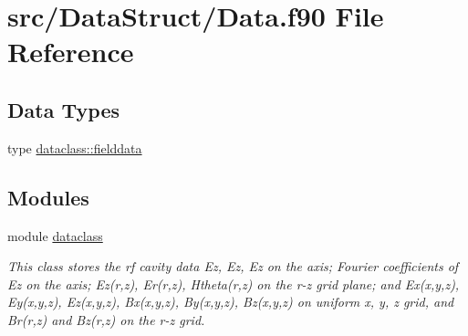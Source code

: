 \hypertarget{_data_8f90}{}\section{src/\+Data\+Struct/\+Data.f90 File Reference}
\label{_data_8f90}
\subsection*{Data Types}
\begin{DoxyCompactItemize}
\item 
type \mbox{\hyperlink{namespacedataclass_structdataclass_1_1fielddata}{dataclass\+::fielddata}}
\end{DoxyCompactItemize}
\subsection*{Modules}
\begin{DoxyCompactItemize}
\item 
module \mbox{\hyperlink{namespacedataclass}{dataclass}}
\begin{DoxyCompactList}\small\item\em This class stores the rf cavity data Ez, Ez\textquotesingle{}, Ez\textquotesingle{}\textquotesingle{} on the axis; Fourier coefficients of Ez on the axis; Ez(r,z), Er(r,z), Htheta(r,z) on the r-\/z grid plane; and Ex(x,y,z), Ey(x,y,z), Ez(x,y,z), Bx(x,y,z), By(x,y,z), Bz(x,y,z) on uniform x, y, z grid, and Br(r,z) and Bz(r,z) on the r-\/z grid. \end{DoxyCompactList}\end{DoxyCompactItemize}
